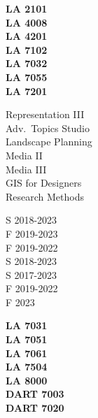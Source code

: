 \documentclass[10pt]{developercv} %
\begin{document}
\clearpage

\printbibliography[title={\cvsect{Awards}}, keyword=awards, heading=subbibliography]



\begin{minipage}[t]{0.1\textwidth} 
\textbf{LA 2101}\\
\textbf{LA 4008}\\
\textbf{LA 4201}\\
\textbf{LA 7102}\\
\textbf{LA 7032}\\
\textbf{LA 7055}\\
\textbf{LA 7201}\\
\end{minipage}
\begin{minipage}[t]{0.2\textwidth} 
Representation III\\
Adv.~Topics Studio\\
Landscape Planning \\
Media II \\
Media III\\
GIS for Designers\\
Research Methods\\
\end{minipage}
\begin{minipage}[t]{0.15\textwidth} 
S 2018-2023\\
F 2019-2023\\
F 2019-2022\\
S 2018-2023\\
S 2017-2023\\
F 2019-2022\\
F 2023\\
\end{minipage}
\begin{minipage}[t]{0.15\textwidth} 
\textbf{LA 7031}\\
\textbf{LA 7051}\\
\textbf{LA 7061}\\
\textbf{LA 7504}\\
\textbf{LA 8000}\\
\textbf{DART 7003}\\
\textbf{DART 7020}\\
\end{minipage}
\end{document}
